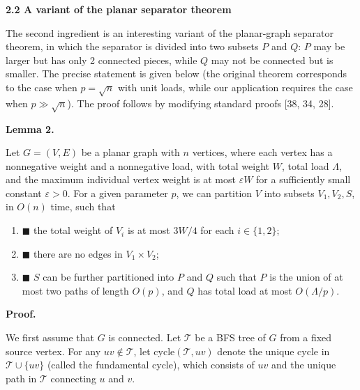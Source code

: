 \documentclass[10pt,a4paper]{article}
\begin{document}
\par
\par\medskip\noindent\textbf{2.2 A variant of the planar separator theorem}\par
The second ingredient is an interesting variant of the planar-graph separator theorem, in which the separator is divided into two subsets $P$ and $Q$: $P$ may be larger but has only 2 connected pieces, while $Q$ may not be connected but is smaller. The precise statement is given below (the original theorem corresponds to the case when $p=\sqrt{n}$ with unit loads, while our application requires the case when $p\gg\sqrt{n}$). The proof follows by modifying standard proofs [38, 34, 28].
\par
\par
\par\medskip\noindent\textbf{Lemma 2.}\par
Let $G=(V,E)$ be a planar graph with $n$ vertices, where each vertex has a nonnegative weight and a nonnegative load, with total weight $W$, total load $\Lambda$, and the maximum individual vertex weight is at most $\varepsilon W$ for a sufficiently small constant $\varepsilon>0$. For a given parameter $p$, we can partition $V$ into subsets $V_{1},V_{2},S$, in $O(n)$ time, such that
\par
\begin{enumerate}
\item[]  $\blacksquare$ 
the total weight of $V_{i}$ is at most $3W/4$ for each $i\in\{1,2\}$;
\par
\par
\item[]  $\blacksquare$ 
there are no edges in $V_{1}\times V_{2}$;
\par
\par
\item[]  $\blacksquare$ 
$S$ can be further partitioned into $P$ and $Q$ such that $P$ is the union of at most two paths of length $O(p)$, and $Q$ has total load at most $O(\Lambda/p)$.
\par
\par
\end{enumerate}
\par
\par
\par\medskip\noindent\textbf{Proof.}\par
We first assume that $G$ is connected. Let $\mathcal{T}$ be a BFS tree of $G$ from a fixed source vertex. For any $uv\not\in\mathcal{T}$, let $\mathrm{cycle}(\mathcal{T},uv)$ denote the unique cycle in $\mathcal{T}\cup\{uv\}$ (called the fundamental cycle), which consists of $uv$ and the unique path in $\mathcal{T}$ connecting $u$ and $v$.
\end{document}
